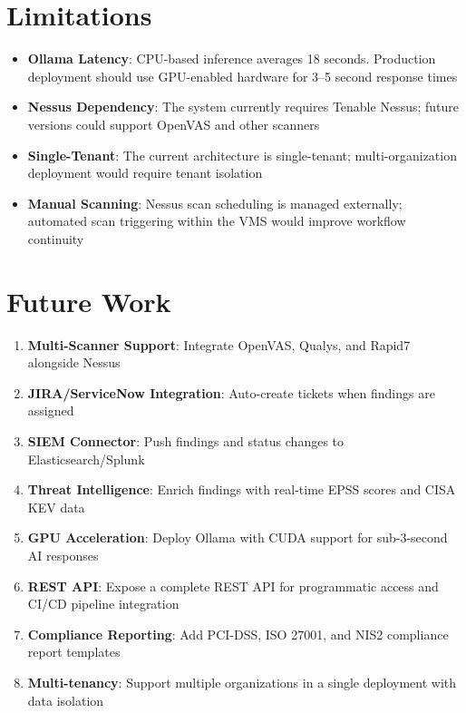 \section*{Limitations}

\begin{itemize}
  \item \textbf{Ollama Latency}: CPU-based inference averages 18 seconds. Production deployment should use GPU-enabled hardware for 3--5 second response times
  \item \textbf{Nessus Dependency}: The system currently requires Tenable Nessus; future versions could support OpenVAS and other scanners
  \item \textbf{Single-Tenant}: The current architecture is single-tenant; multi-organization deployment would require tenant isolation
  \item \textbf{Manual Scanning}: Nessus scan scheduling is managed externally; automated scan triggering within the VMS would improve workflow continuity
\end{itemize}

\section*{Future Work}

\begin{enumerate}
  \item \textbf{Multi-Scanner Support}: Integrate OpenVAS, Qualys, and Rapid7 alongside Nessus
  \item \textbf{JIRA/ServiceNow Integration}: Auto-create tickets when findings are assigned
  \item \textbf{SIEM Connector}: Push findings and status changes to Elasticsearch/Splunk
  \item \textbf{Threat Intelligence}: Enrich findings with real-time EPSS scores and CISA KEV data
  \item \textbf{GPU Acceleration}: Deploy Ollama with CUDA support for sub-3-second AI responses
  \item \textbf{REST API}: Expose a complete REST API for programmatic access and CI/CD pipeline integration
  \item \textbf{Compliance Reporting}: Add PCI-DSS, ISO 27001, and NIS2 compliance report templates
  \item \textbf{Multi-tenancy}: Support multiple organizations in a single deployment with data isolation
\end{enumerate}

